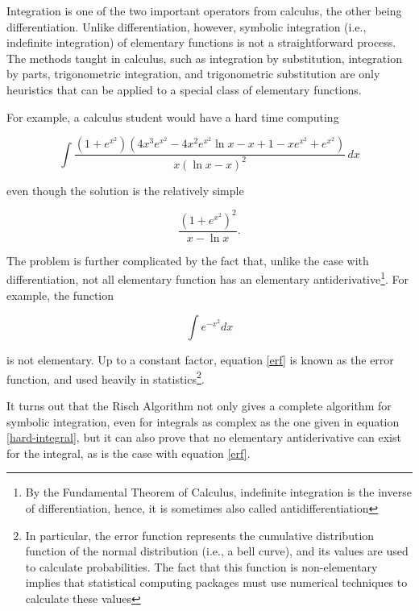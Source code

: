\documentclass[12pt]{article}
\begin{document}
Integration is one of the two important operators from calculus, the
other being differentiation.  Unlike differentiation, however, symbolic
integration (i.e., indefinite integration) of elementary functions is
not a straightforward process. The methods taught in calculus, such as
integration by substitution, integration by parts, trigonometric
integration, and trigonometric substitution are only heuristics that can
be applied to a special class of elementary functions.  

For example, a calculus student would have a hard time computing

\begin{equation}
\label{hard-integral}
\int{
    \frac{\left( 1 + e^{x^2} \right)
        \left(4x^3e^{x^2} - 4x^2e^{x^2}\ln{x} - x + 1 - xe^{x^2} +
        e^{x^2}\right)}
    {x\left(\ln{x} - x\right)^2}\,dx}
\end{equation}

even though the solution is the relatively simple 

\begin{equation}
\label{hard-integral-sol}
\frac{\left(1 + e^{x^{2}}\right)^{2}}{x - \ln{x}}.
\end{equation}

The problem is further complicated by the fact that, unlike the case
with differentiation, not all elementary function has an elementary
antiderivative\footnote{By the Fundamental Theorem of Calculus,
indefinite integration is the inverse of differentiation, hence, it is
sometimes also called antidifferentiation}.  For example, the function

\begin{equation}
\label{erf}
\int{e^{-x^2}dx}
\end{equation}

is not elementary.  Up to a constant factor, equation \ref{erf} is known
as the error function, and used heavily in statistics\footnote{In
particular, the error function represents the cumulative distribution
function of the normal distribution (i.e., a bell curve), and its values
are used to calculate probabilities.  The fact that this function is
non-elementary implies that statistical computing packages must use
numerical techniques to calculate these values}.

It turns out that the Risch Algorithm not only gives a complete
algorithm for symbolic integration, even for integrals as complex as the
one given in equation \ref{hard-integral}, but it can also prove that no
elementary antiderivative can exist for the integral, as is the case
with equation \ref{erf}.
\end{document}
